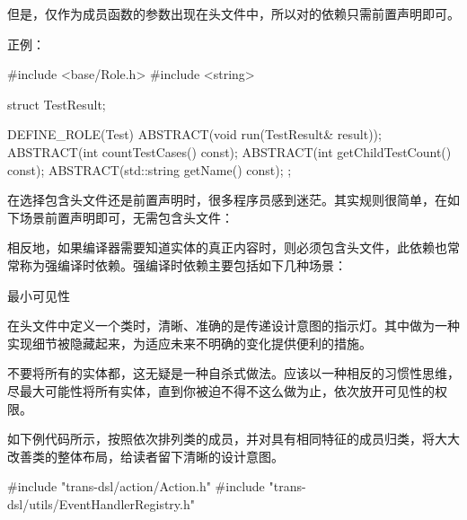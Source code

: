 \begin{content}
但是，仅作为成员函数的参数出现在头文件中，所以对的依赖只需前置声明即可。

正例：
\begin{leftbar}
\begin{c++}
#include <base/Role.h>
#include <string>

struct TestResult;

DEFINE_ROLE(Test)
{
    ABSTRACT(void run(TestResult& result));
    ABSTRACT(int countTestCases() const);
    ABSTRACT(int getChildTestCount() const);
    ABSTRACT(std::string getName() const);
};
\end{c++}
\end{leftbar}

在选择包含头文件还是前置声明时，很多程序员感到迷茫。其实规则很简单，在如下场景前置声明即可，无需包含头文件：

\begin{enum}
\end{enum}

相反地，如果编译器需要知道实体的真正内容时，则必须包含头文件，此依赖也常常称为强编译时依赖。强编译时依赖主要包括如下几种场景：
\begin{enum}
\end{enum}

\begin{principle}
最小可见性
\end{principle}

在头文件中定义一个类时，清晰、准确的是传递设计意图的指示灯。其中做为一种实现细节被隐藏起来，为适应未来不明确的变化提供便利的措施。

不要将所有的实体都，这无疑是一种自杀式做法。应该以一种相反的习惯性思维，尽最大可能性将所有实体，直到你被迫不得不这么做为止，依次放开可见性的权限。

如下例代码所示，按照依次排列类的成员，并对具有相同特征的成员归类，将大大改善类的整体布局，给读者留下清晰的设计意图。

\begin{leftbar}
\begin{c++}
#include "trans-dsl/action/Action.h"
#include "trans-dsl/utils/EventHandlerRegistry.h"


\end{c++}
\end{leftbar}
\end{content}

